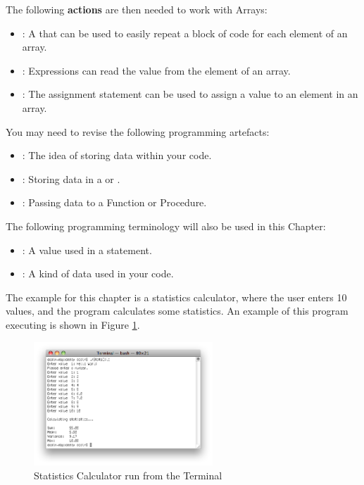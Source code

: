 The following \textbf{actions} are then needed to work with Arrays:
\begin{itemize}
  \item {}: A  that can be used to easily repeat a block of code for each element of an array.
  \item {}: Expressions can read the value from the element of an array.
  \item {}: The assignment statement can be used to assign a value to an element in an array.
\end{itemize}

\bigskip

You may need to revise the following programming artefacts:
\begin{itemize}
  \item {}: The idea of storing data within your code.
  \item {}: Storing data in a  or .
  \item {}: Passing data to a Function or Procedure.
\end{itemize}

The following programming terminology will also be used in this Chapter:
\begin{itemize}
  \item {}: A value used in a statement.
  \item {}: A kind of data used in your code.
\end{itemize}

The example for this chapter is a statistics calculator, where the user enters 10 values, and the program calculates some statistics. An example of this program executing is shown in Figure \ref{fig:simple-stats}.

\begin{figure}[h]
   \centering
   \includegraphics[width=0.6\textwidth]{./topics/arrays/images/SimpleStats} 
   \caption[Statistics Calculator Terminal]{Statistics Calculator run from the Terminal}
   \label{fig:simple-stats}
\end{figure}


